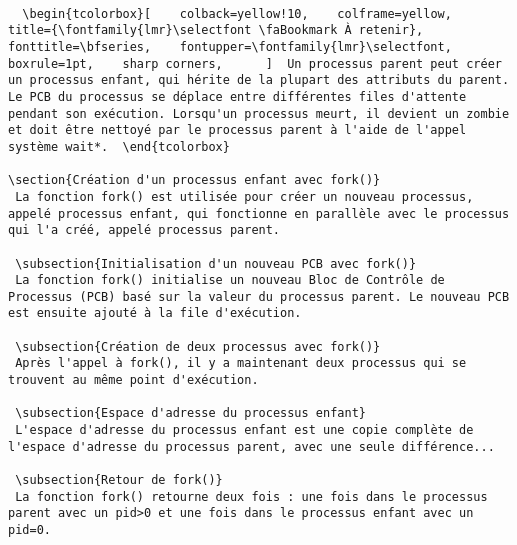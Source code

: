 \documentclass[12pt]{report}
\begin{document}
\begin{lstlisting}

  \begin{tcolorbox}[    colback=yellow!10,    colframe=yellow,    title={\fontfamily{lmr}\selectfont \faBookmark À retenir},    fonttitle=\bfseries,    fontupper=\fontfamily{lmr}\selectfont,    boxrule=1pt,    sharp corners,      ]  Un processus parent peut créer un processus enfant, qui hérite de la plupart des attributs du parent. Le PCB du processus se déplace entre différentes files d'attente pendant son exécution. Lorsqu'un processus meurt, il devient un zombie et doit être nettoyé par le processus parent à l'aide de l'appel système wait*.  \end{tcolorbox}  

\section{Création d'un processus enfant avec fork()} 
 La fonction fork() est utilisée pour créer un nouveau processus, appelé processus enfant, qui fonctionne en parallèle avec le processus qui l'a créé, appelé processus parent. 
 
 \subsection{Initialisation d'un nouveau PCB avec fork()} 
 La fonction fork() initialise un nouveau Bloc de Contrôle de Processus (PCB) basé sur la valeur du processus parent. Le nouveau PCB est ensuite ajouté à la file d'exécution. 
 
 \subsection{Création de deux processus avec fork()} 
 Après l'appel à fork(), il y a maintenant deux processus qui se trouvent au même point d'exécution. 
 
 \subsection{Espace d'adresse du processus enfant} 
 L'espace d'adresse du processus enfant est une copie complète de l'espace d'adresse du processus parent, avec une seule différence... 
 
 \subsection{Retour de fork()} 
 La fonction fork() retourne deux fois : une fois dans le processus parent avec un pid>0 et une fois dans le processus enfant avec un pid=0. 
 

\end{lstlisting}
\end{document}
